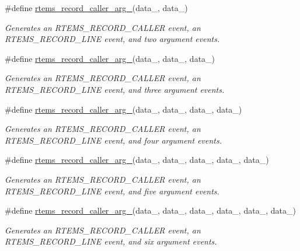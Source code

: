 \begin{DoxyCompactItemize}
\#define \mbox{\hyperlink{group__RTEMSRecord_ga51b94f8e9765882257bef6eef809b9be}{rtems\+\_\+record\+\_\+caller\+\_\+arg\+\_}}(data\+\_,  data\+\_)
\begin{DoxyCompactList}\small\item\em Generates an R\+T\+E\+M\+S\+\_\+\+R\+E\+C\+O\+R\+D\+\_\+\+C\+A\+L\+L\+ER event, an R\+T\+E\+M\+S\+\_\+\+R\+E\+C\+O\+R\+D\+\_\+\+L\+I\+NE event, and two argument events. \end{DoxyCompactList}\item 
\#define \mbox{\hyperlink{group__RTEMSRecord_gaf9793b1b177584659f6cd0942c4b44a2}{rtems\+\_\+record\+\_\+caller\+\_\+arg\+\_}}(data\+\_,  data\+\_,  data\+\_)
\begin{DoxyCompactList}\small\item\em Generates an R\+T\+E\+M\+S\+\_\+\+R\+E\+C\+O\+R\+D\+\_\+\+C\+A\+L\+L\+ER event, an R\+T\+E\+M\+S\+\_\+\+R\+E\+C\+O\+R\+D\+\_\+\+L\+I\+NE event, and three argument events. \end{DoxyCompactList}\item 
\#define \mbox{\hyperlink{group__RTEMSRecord_ga25f412c1ab2847c57d00d01c17bb9650}{rtems\+\_\+record\+\_\+caller\+\_\+arg\+\_}}(data\+\_,  data\+\_,  data\+\_,  data\+\_)
\begin{DoxyCompactList}\small\item\em Generates an R\+T\+E\+M\+S\+\_\+\+R\+E\+C\+O\+R\+D\+\_\+\+C\+A\+L\+L\+ER event, an R\+T\+E\+M\+S\+\_\+\+R\+E\+C\+O\+R\+D\+\_\+\+L\+I\+NE event, and four argument events. \end{DoxyCompactList}\item 
\#define \mbox{\hyperlink{group__RTEMSRecord_gaed44279a44f73520fc066f6b5f27498e}{rtems\+\_\+record\+\_\+caller\+\_\+arg\+\_}}(data\+\_,  data\+\_,  data\+\_,  data\+\_,  data\+\_)
\begin{DoxyCompactList}\small\item\em Generates an R\+T\+E\+M\+S\+\_\+\+R\+E\+C\+O\+R\+D\+\_\+\+C\+A\+L\+L\+ER event, an R\+T\+E\+M\+S\+\_\+\+R\+E\+C\+O\+R\+D\+\_\+\+L\+I\+NE event, and five argument events. \end{DoxyCompactList}\item 
\#define \mbox{\hyperlink{group__RTEMSRecord_ga077ca577f32322b1362e428394e9db50}{rtems\+\_\+record\+\_\+caller\+\_\+arg\+\_}}(data\+\_,  data\+\_,  data\+\_,  data\+\_,  data\+\_,  data\+\_)
\begin{DoxyCompactList}\small\item\em Generates an R\+T\+E\+M\+S\+\_\+\+R\+E\+C\+O\+R\+D\+\_\+\+C\+A\+L\+L\+ER event, an R\+T\+E\+M\+S\+\_\+\+R\+E\+C\+O\+R\+D\+\_\+\+L\+I\+NE event, and six argument events. \end{DoxyCompactList}\item 

\end{DoxyCompactItemize}
